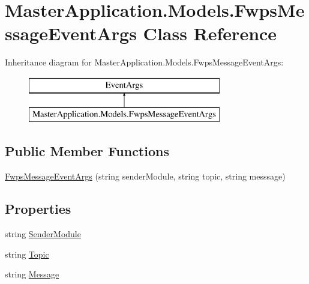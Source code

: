 \hypertarget{class_master_application_1_1_models_1_1_fwps_message_event_args}{}\section{Master\+Application.\+Models.\+Fwps\+Message\+Event\+Args Class Reference}
\label{class_master_application_1_1_models_1_1_fwps_message_event_args}
Inheritance diagram for Master\+Application.\+Models.\+Fwps\+Message\+Event\+Args\+:\begin{figure}[H]
\begin{center}
\leavevmode
\includegraphics[height=2.000000cm]{class_master_application_1_1_models_1_1_fwps_message_event_args}
\end{center}
\end{figure}
\subsection*{Public Member Functions}
\begin{DoxyCompactItemize}
\item 
\mbox{\hyperlink{class_master_application_1_1_models_1_1_fwps_message_event_args_aec89e70d17a132007b6dc181359fa8de}{Fwps\+Message\+Event\+Args}} (string sender\+Module, string topic, string messsage)
\end{DoxyCompactItemize}
\subsection*{Properties}
\begin{DoxyCompactItemize}
\item 
string \mbox{\hyperlink{class_master_application_1_1_models_1_1_fwps_message_event_args_a03a2b419842db0e8d552a6d72e8c85ca}{Sender\+Module}}
\item 
string \mbox{\hyperlink{class_master_application_1_1_models_1_1_fwps_message_event_args_aadc403c020e25d21d0996de3a21ba16a}{Topic}}
\item 
string \mbox{\hyperlink{class_master_application_1_1_models_1_1_fwps_message_event_args_a433108a23ae4f6584cbee2528680a9ac}{Message}}
\end{DoxyCompactItemize}


